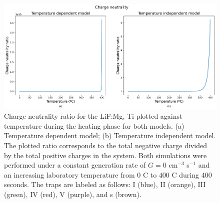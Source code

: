 \begin{figure}[ht]
    \centering
    \includegraphics[width=\textwidth]{Images/Heating Charge neutrality.png}
    \caption{Charge neutrality ratio for the LiF:Mg, Ti plotted against temperature during the heating phase for both models. (a) Temperature dependent model; (b) Temperature independent model. The plotted ratio corresponds to the total negative charge divided by the total positive charges in the system. Both simulations were performed under a constant generation rate of $G = 0$ cm$^{-3}$ s$^{-1}$ and an increasing laboratory temperature from 0 \textdegree C to 400 \textdegree C during 400 seconds. The traps are labeled as follows: I (blue), II (orange), III (green), IV (red), V (purple), and s (brown).}
    \label{fig:heating_chneutrality}
\end{figure}
